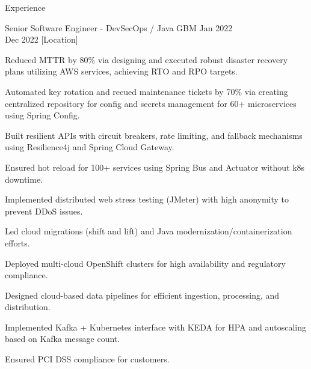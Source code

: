 \begin{rSection}{Experience}
    \begin{rSubsection}
        {Senior Software Engineer - DevSecOps / Java}
        {GBM}
        {Jan 2022 \\ Dec 2022}
        [Location] %
        \begin{rItemize}
            \item Reduced MTTR by 80\% via designing and executed robust disaster recovery plans utilizing AWS services, achieving RTO and RPO targets.
            \item Automated key rotation and recued maintenance tickets by 70\% via creating centralized repository for config and secrets management for 60+ microservices using Spring Config.
            \item Built resilient APIs with circuit breakers, rate limiting, and fallback mechanisms using Resilience4j and Spring Cloud Gateway.
            \item Ensured hot reload for 100+ services using Spring Bus and Actuator without k8s downtime.
            \item Implemented distributed web stress testing (JMeter) with high anonymity to prevent DDoS issues.
            \item Led cloud migrations (shift and lift) and Java modernization/containerization efforts.
            \item Deployed multi-cloud OpenShift clusters for high availability and regulatory compliance.
            \item Designed cloud-based data pipelines for efficient ingestion, processing, and distribution.
            \item Implemented Kafka + Kubernetes interface with KEDA for HPA and autoscaling based on Kafka message count.
            \item Ensured PCI DSS compliance for customers.
        \end{rItemize}
    \end{rSubsection}


\end{rSection}
